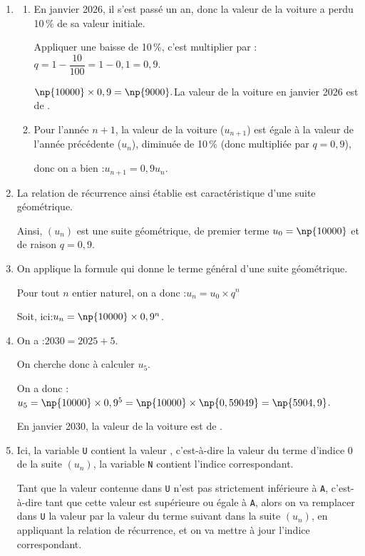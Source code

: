 \begin{enumerate}
	\item \begin{enumerate}
		\item En janvier 2026, il s'est passé un an, donc la valeur de la voiture a perdu 10\,\% de sa valeur initiale.

		Appliquer une baisse de 10\,\%, c'est multiplier par :\quad $q = 1 - \dfrac{10}{100} = 1 - 0,1 = 0,9$.

		$\np{10000} \times 0,9 = \np{9000}.$\quad	La valeur de la voiture en janvier 2026 est de .

		\item Pour l'année $n+1$, la valeur de la voiture ($u_{n+1}$) est égale à la valeur de l'année précédente ($u_n$), diminuée de 10\,\% (donc multipliée par $q = 0,9$),

		donc on a bien :\quad $u_{n+1} = 0,9u_n$.
	\end{enumerate}

	\item La relation de récurrence ainsi établie est caractéristique d'une suite géométrique.

	Ainsi, $(u_n)$ est une suite géométrique, de premier terme $u_0 = \np{10000}$ et de raison $q = 0,9$.

	\item On applique la formule qui donne le terme général d'une suite géométrique.

	Pour tout $n$ entier naturel, on a donc :\quad $u_n = u_0\times q^n$

	Soit, ici:\quad $u_n = \np{10000}\times 0,9^n$.

	\item On a :\quad $2030 = 2025 + 5$.

	On cherche donc à calculer $u_5$.

	On a donc :\quad $u_5 = \np{10000}\times 0,9^5 = \np{10000} \times \np{0,59049} = \np{5904,9}$.

	En janvier 2030, la valeur de la voiture est de .

	\item Ici, la variable \texttt{U} contient la valeur , c'est-à-dire la valeur du terme d'indice 0 de la suite $(u_n)$, la variable \texttt{N} contient l'indice correspondant.

	Tant que la valeur contenue dans \texttt{U} n'est pas strictement inférieure à \texttt{A}, c'est-à-dire tant que cette valeur est supérieure ou égale à \texttt{A}, alors on va remplacer dans \texttt{U} la valeur par la valeur du terme suivant dans la suite $(u_n)$, en appliquant la relation de récurrence, et on va mettre à jour l'indice correspondant.


\end{enumerate}
